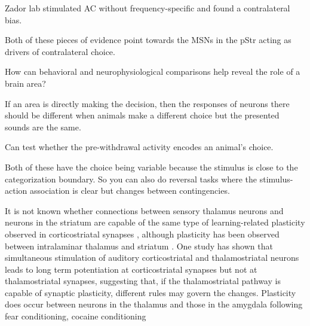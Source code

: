 %
%



Zador lab stimulated AC without frequency-specific and found a contralateral bias.

Both of these pieces of evidence point towards the MSNs in the pStr acting as drivers of contralateral choice. 


How can behavioral and neurophysiological comparisons help reveal the role of a brain area?

If an area is directly making the decision, then the responses of neurons there should be different when animals make a different choice but the presented sounds are the same. 

Can test whether the pre-withdrawal activity encodes an animal's choice.

Both of these have the choice being variable because the stimulus is close to the categorization boundary. So you can also do reversal tasks where the stimulus-action association is clear but changes between contingencies. 


It is not known whether connections between sensory thalamus neurons and neurons in the striatum are capable of the same type of learning-related plasticity observed in corticostriatal synapses \citep{Xiong2015}, although plasticity has been observed between intralaminar thalamus and striatum \citep{Parker2016}.
%
One study has shown that simultaneous stimulation of auditory corticostriatal and thalamostriatal neurons leads to long term potentiation at corticostriatal synapses but not at thalamostriatal synapses, suggesting that, if the thalamostriatal pathway is capable of synaptic plasticity, different rules may govern the changes. 
Plasticity does occur between neurons in the thalamus and those in the amygdala following fear conditioning,
cocaine conditioning \citep{Rich2019}

